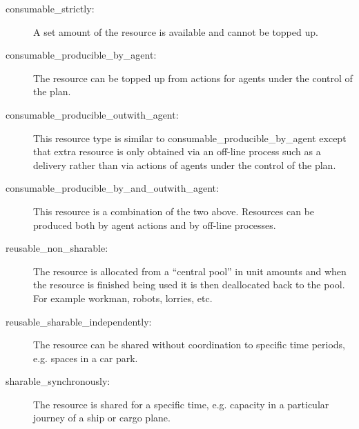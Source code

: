 \begin{description}

\item [consumable\_strictly:]
A set amount of the resource is available and cannot be topped up.

\item [consumable\_producible\_by\_agent:]
The resource can be topped up from actions for agents under the control of the
plan.

\item [consumable\_producible\_outwith\_agent:]
This resource type is similar to consumable\_producible\_by\_agent except
that extra resource is only obtained via an off-line process such as a
delivery rather than via actions of agents under the control of the plan.

\item [consumable\_producible\_by\_and\_outwith\_agent:]
This resource is a combination of the two above.  Resources can be produced
both by agent actions and by off-line processes.

\item [reusable\_non\_sharable:]
The resource is allocated from a ``central pool'' in unit amounts and when the
resource is finished being used it is then deallocated back to the pool.  For
example workman, robots, lorries, etc.

\item [reusable\_sharable\_independently:]
The resource can be shared without coordination to specific time periods,
e.g. spaces in a car park.

\item [sharable\_synchronously:]
The resource is shared for a specific time, e.g.  capacity in a particular
journey of a ship or cargo plane.

\end{description}

